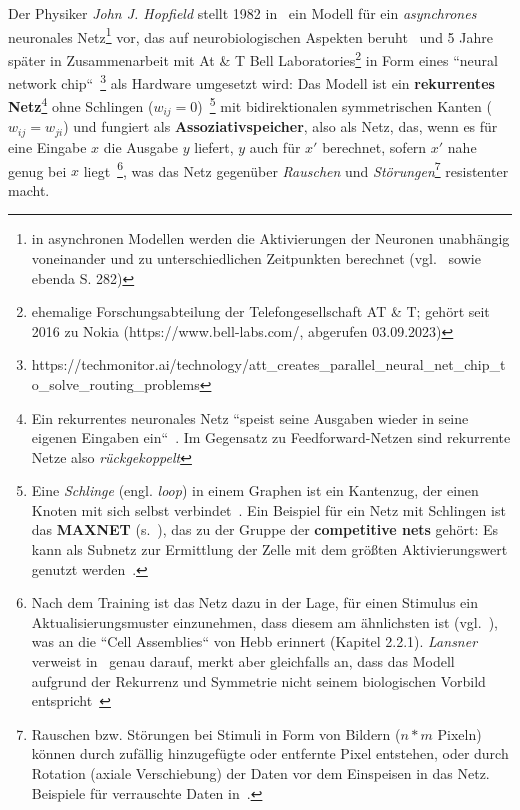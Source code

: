Der Physiker \textit{John J. Hopfield} stellt 1982 in~\cite{Hop82} ein Modell für ein \textit{asynchrones} neuronales Netz\footnote{
    in asynchronen Modellen werden die Aktivierungen der Neuronen unabhängig voneinander und zu unterschiedlichen Zeitpunkten berechnet (vgl.~\cite[49]{Roj93} sowie ebenda S. 282)
}  vor, das auf neurobiologischen Aspekten beruht~\cite[2554]{Hop82} und 5 Jahre später in Zusammenarbeit mit At & T Bell Laboratories\footnote{
    ehemalige Forschungsabteilung der Telefongesellschaft AT \& T;  gehört seit 2016 zu Nokia (https://www.bell-labs.com/, abgerufen 03.09.2023)
} in Form eines ``neural network chip``~\cite[457]{AR88}\footnote{
    https://techmonitor.ai/technology/att\_creates\_parallel\_neural\_net\_chip\_to\_solve\_routing\_problems
} als Hardware umgesetzt wird: Das Modell ist ein \textbf{rekurrentes Netz}\footnote{
Ein rekurrentes neuronales Netz ``speist seine Ausgaben wieder in seine eigenen Eingaben ein``~\cite[847]{RN09}. Im Gegensatz zu Feedforward-Netzen sind rekurrente Netze also \textit{rückgekoppelt}
} ohne Schlingen ($w_{ij} = 0$)~\cite[291]{Ert21b}\footnote{ Eine \textit{Schlinge} (engl. \textit{loop}) in einem Graphen ist ein Kantenzug, der einen Knoten mit sich selbst verbindet~\cite[30]{Die17}. Ein Beispiel für ein Netz mit Schlingen ist das \textbf{MAXNET} (s.~\cite{Lip87}), das zu der Gruppe der \textbf{competitive nets} gehört: Es kann als Subnetz zur Ermittlung der Zelle mit dem größten Aktivierungswert genutzt werden~\cite[158 f.]{Fau94}.
} mit bidirektionalen symmetrischen Kanten ($w_{ij} = w_{ji}$) und fungiert als \textbf{Assoziativspeicher}, also als Netz, das, wenn es für eine Eingabe $x$ die Ausgabe $y$ liefert, $y$ auch für $x'$ berechnet, sofern $x'$ nahe genug bei $x$ liegt~\cite[251]{Roj93}\footnote{
    Nach dem Training ist das Netz dazu in der Lage, für einen Stimulus ein Aktualisierungsmuster einzunehmen, dass diesem am ähnlichsten ist (vgl.~\cite[882]{RN09}), was an die ``Cell Assemblies`` von Hebb erinnert (Kapitel 2.2.1). \textit{Lansner} verweist in~\cite[179]{Lan09} genau darauf, merkt aber gleichfalls an, dass das Modell aufgrund der Rekurrenz und Symmetrie nicht seinem biologischen Vorbild entspricht~\cite[180]{Lan09}
}, was das Netz gegenüber \textit{Rauschen} und \textit{Störungen}\footnote{
    Rauschen bzw. Störungen bei Stimuli in Form von Bildern ($n * m$ Pixeln) können durch zufällig hinzugefügte oder entfernte Pixel entstehen, oder durch Rotation (axiale Verschiebung) der Daten vor dem Einspeisen in das Netz. Beispiele für verrauschte Daten in~\cite[294]{Ert21b}.
} resistenter macht.
